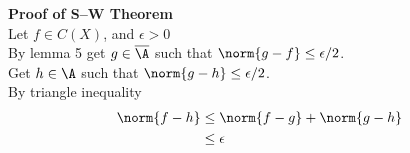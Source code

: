 \textbf{Proof of S--W Theorem} \\
Let $f\in C(X)$, and $\epsilon>0$ \\
By lemma 5 get $g\in\overline\A$ such that $\norm{g-f}\leq\epsilon/2$. \\
Get $h\in\A$ such that $\norm{g-h}\leq\epsilon/2$. \\
By triangle inequality
\begin{align*}
\norm{f-h} &\leq \norm{f-g}+\norm{g-h} \\
&\leq \epsilon
\end{align*}
